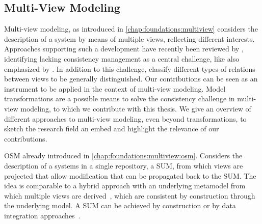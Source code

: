 \subsection{Multi-View Modeling}

Multi-view modeling, as introduced in \autoref{chap:foundations:multiview} considers the description of a system by means of multiple views, reflecting different interests.
Approaches supporting such a development have recently been reviewed by \textcite{cicchetti2019multiview-SoSym}, identifying lacking consistency management as a central challenge, like also emphasized by \textcite{reineke2019ProblemMultiView-SoSym}.
In addition to this challenge, \textcite{persson2013characterizationMultiView-EMSOFT} classify different types of relations between views to be generally distinguished.
Our contributions can be seen as an instrument to be applied in the context of multi-view modeling.
Model transformations are a possible means to solve the consistency challenge in multi-view modeling, to which we contribute with this thesis.
We give an overview of different approaches to multi-view modeling, even beyond transformations, to sketch the research field an embed and highlight the relevance of our contributions.

\gls{OSM} already introduced in \autoref{chap:foundations:multiview:osm}.
Considers the description of a systems in a single repository, a \gls{SUM}, from which views are projected that allow modification that can be propagated back to the \gls{SUM}.
The idea is comparable to a hybrid approach with an underlying metamodel from which multiple views are derived~\cite{cicchetti2012hybridMultiView-EASST}, which are consistent by construction through the underlying model.
A \gls{SUM} can be achieved by construction or by data integration approaches~\cite{angel2018integration-CLSS}.

